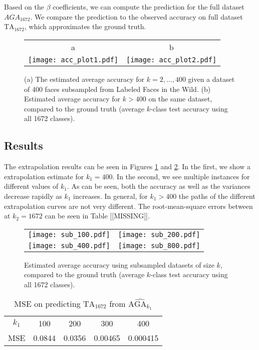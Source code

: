 \documentclass[twoside,11pt]{article}
\begin{document}
Based on the $\beta$ coefficients, we can compute the prediction for the full dataset $\hat{AGA}_{1672}$.
We compare the prediction to the observed accuracy on full dataset $\text{TA}_{1672}$, which approximates the ground truth.


\begin{figure}
\centering
\begin{tabular}{cc}
a & b\\
\texttt{[image: acc\_plot1.pdf]} &
\texttt{[image: acc\_plot2.pdf]}
\end{tabular}
\caption{(a) The estimated average accuracy for $k = 2,\hdots,
  400$ given a dataset of 400 faces subsampled from Labeled Faces in
  the Wild.  (b) Estimated average accuracy for $k > 400$ on the
  same dataset, compared to the ground truth (average $k$-class test accuracy
  using all 1672 classes).}
\label{fig:lfw_extrapolation1}
\end{figure}

\subsection{Results}

The extrapolation results can be seen in Figures \ref{fig:lfw_extrapolation1}  and \ref{fig:lfw_extrapolation2}. In the first, we show a extrapolation estimate for $k_1 = 400$. In the second, we see multiple instances for different values of $k_1$. As can be seen, both the accuracy as well as the variances decrease rapidly as $k_1$ increases. In general, for $k_1>400$ the paths of the different extrapolation curves are not very different. The root-mean-square errors between at $k_2=1672$ can be seen in Table [[MISSING]].

\begin{figure}
\centering
\begin{tabular}{cc}
\texttt{[image: sub\_100.pdf]} &
\texttt{[image: sub\_200.pdf]} \\
\texttt{[image: sub\_400.pdf]} &
\texttt{[image: sub\_800.pdf]} 
\end{tabular}
\caption{Estimated average accuracy using subsampled datasets of size
  $k$, compared to the ground truth (average $k$-class test accuracy
  using all 1672 classes).}
\label{fig:lfw_extrapolation2}
\end{figure}

\begin{table}
\centering
\begin{tabular}{c||c|c|c|c}
$k_1$ & 100 & 200 & 300 & 400 \\
MSE & 0.0844 & 0.0356 & 0.00465 & 0.000415
\end{tabular}
\caption{MSE on predicting $\text{TA}_{1672}$ from $\widehat{\text{AGA}_{k_1}}$}
\end{table}
\end{document}
